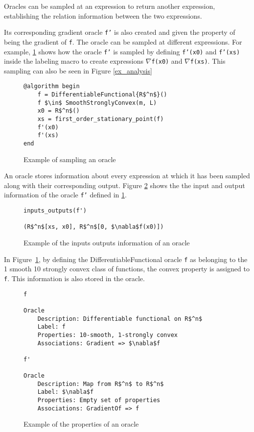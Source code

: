 Oracles can be sampled at an expression to return another expression, establishing the relation information between the two expressions.

Its corresponding gradient oracle \texttt{f'} is also created and given the property of being the gradient of \texttt{f}. The oracle can be sampled at different expressions. For example, \ref*{ex_sampling} shows how the oracle \texttt{f'} is sampled by defining \texttt{f'(x0)} and \texttt{f'(xs)} inside the labeling macro to create expressions \texttt{$\nabla $f(x0)} and \texttt{$\nabla $f(xs)}. This sampling can also be seen in Figure \ref*{ex_analysis}

\begin{figure}[!h]
	\begin{lstlisting}[mathescape]
@algorithm begin
	f = DifferentiableFunctional{R$^n$}()
	f $\in$ SmoothStronglyConvex(m, L)
	x0 = R$^n$()
	xs = first_order_stationary_point(f)
	f'(x0)
	f'(xs)
end
\end{lstlisting}
\caption{Example of sampling an oracle}
\label{ex_sampling}
\end{figure}

An oracle stores information about every expression at which it has been sampled along with their corresponding output. Figure \ref*{ex_inputs_outputs} shows the the input and output information of the oracle \texttt{f'} defined in \ref*{ex_sampling}.

\begin{figure}[!h]
	\begin{lstlisting}[mathescape]
inputs_outputs(f')

(R$^n$[xs, x0], R$^n$[0, $\nabla$f(x0)])
\end{lstlisting}
\caption{Example of the inputs outputs information of an oracle}
\label{ex_inputs_outputs}
\end{figure}

In Figure~\ref{ex_sampling}, by defining the DifferentiableFunctional oracle \texttt{f} as belonging to the 1 smooth 10 strongly convex class of functions, the convex property is assigned to \texttt{f}. This information is also stored in the oracle.

\begin{figure}[!h]
	\begin{lstlisting}[mathescape]
f

Oracle
	Description: Differentiable functional on R$^n$
	Label: f
	Properties: 10-smooth, 1-strongly convex
	Associations: Gradient => $\nabla$f

f'

Oracle
	Description: Map from R$^n$ to R$^n$
	Label: $\nabla$f
	Properties: Empty set of properties
	Associations: GradientOf => f
\end{lstlisting}
\caption{Example of the properties of an oracle}
\label{ex_properties}
\end{figure}


